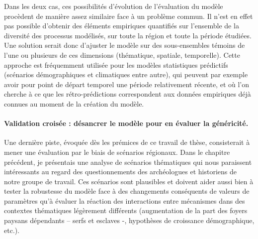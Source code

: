 Dans les deux cas, ces possibilités d'évolution de l'évaluation du modèle procèdent de manière assez similaire face à un problème commun.
Il n'est en effet pas possible d'obtenir des éléments empiriques quantifiés sur l'ensemble de la diversité des processus modélisés, sur toute la région et toute la période étudiées.
Une solution serait donc d'ajuster le modèle sur des sous-ensembles témoins de l'une ou plusieurs de ces dimensions (thématique, spatiale, temporelle).
Cette approche est fréquemment utilisée pour les modèles statistiques prédictifs (scénarios démographiques et climatiques entre autre), qui peuvent par exemple avoir pour point de départ temporel une période relativement récente, et où l'on cherche à ce que les \og rétro-prédictions\fg{} correspondent aux données empiriques déjà connues au moment de la création du modèle.


\paragraph{Validation croisée : désancrer le modèle pour en évaluer la généricité.}\label{par:validation-croisee}
Une dernière piste, évoquée dès les prémices de ce travail de thèse, consisterait à mener une évaluation par le biais de \og scénarios régionaux\fg{}.
Dans le chapitre précédent, je présentais une analyse de scénarios thématiques qui nous paraissent intéressants au regard des questionnements des archéologues et historiens de notre groupe de travail.
Ces scénarios sont plausibles et doivent aider aussi bien à tester la robustesse du modèle face à des changements conséquents de valeurs de paramètres qu'à évaluer la réaction des interactions entre mécanismes dans des contextes thématiques légèrement différents (augmentation de la part des foyers paysans dépendants -- serfs et esclaves -, hypothèses de croissance démographique, etc.).


